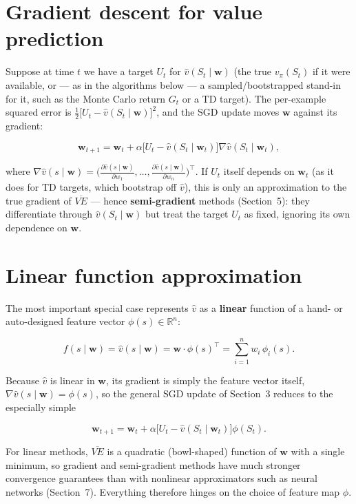 \documentclass[11pt]{article}
\begin{document}
\section{Gradient descent for value prediction}

Suppose at time $t$ we have a target $U_t$ for $\hat v(S_t \mid
\mathbf{w})$ (the true $v_\pi(S_t)$ if it were available, or — as in the
algorithms below — a sampled/bootstrapped stand-in for it, such as the
Monte Carlo return $G_t$ or a TD target). The per-example squared error is
$\frac{1}{2}\big[U_t - \hat v(S_t \mid \mathbf{w})\big]^2$, and the SGD
update moves $\mathbf{w}$ against its gradient:

\[
    \mathbf{w}_{t+1} = \mathbf{w}_t + \alpha \Big[ U_t - \hat v(S_t \mid \mathbf{w}_t) \Big] \nabla \hat v(S_t \mid \mathbf{w}_t),
\]

where $\nabla \hat v(s \mid \mathbf{w}) = \big(\frac{\partial \hat
v(s\mid\mathbf{w})}{\partial w_1}, \dots, \frac{\partial \hat
v(s\mid\mathbf{w})}{\partial w_n}\big)^{\!\top}$. If $U_t$ itself depends
on $\mathbf{w}_t$ (as it does for TD targets, which bootstrap off
$\hat v$), this is only an approximation to the true gradient of
$\overline{VE}$ — hence \textbf{semi-gradient} methods (Section~5): they
differentiate through $\hat v(S_t \mid \mathbf{w})$ but treat the target
$U_t$ as fixed, ignoring its own dependence on $\mathbf{w}$.

\section{Linear function approximation}

The most important special case represents $\hat v$ as a \textbf{linear}
function of a hand- or auto-designed feature vector $\phi(s) \in
\mathbb{R}^n$:

\[
    f(s \mid \mathbf{w}) = \hat v(s \mid \mathbf{w}) = \mathbf{w} \cdot \phi(s)^{\top} = \sum_{i=1}^{n} w_i\, \phi_i(s).
\]

Because $\hat v$ is linear in $\mathbf{w}$, its gradient is simply the
feature vector itself, $\nabla \hat v(s \mid \mathbf{w}) = \phi(s)$, so the
general SGD update of Section~3 reduces to the especially simple

\[
    \mathbf{w}_{t+1} = \mathbf{w}_t + \alpha \Big[ U_t - \hat v(S_t \mid \mathbf{w}_t) \Big] \phi(S_t).
\]

For linear methods, $\overline{VE}$ is a quadratic (bowl-shaped) function
of $\mathbf{w}$ with a single minimum, so gradient and semi-gradient
methods have much stronger convergence guarantees than with nonlinear
approximators such as neural networks (Section~7). Everything therefore
hinges on the choice of feature map $\phi$.
\end{document}

